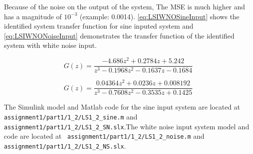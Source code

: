 Because of the noise on the output of the system, The MSE is much higher and has a magnitude of $10^{-3}$ (example: 0.0014). \autoref{eq:LSIWNOSineInput} shows the identified system transfer function for sine inputed system and \autoref{eq:LSIWNONoiseInput} demonstrates the transfer function of the identified system with white noise input.


\begin{equation}
	G(z) =	\frac{-4.686 z^2 + 0.2784 z + 5.242}{z^3 - 0.1968 z^2 - 0.1637 z - 0.1684}
	\label{eq:LSIWNOSineInput}
\end{equation}

\begin{equation}
	G(z) =	\frac{0.04364 z^2 + 0.0236 z + 0.008192}{z^3 - 0.7608 z^2 - 0.3535 z + 0.1425}
	\label{eq:LSIWNONoiseInput}
\end{equation}

The Simulink model and Matlab code for the sine input system are located at  \hspace{-1ex}\lstinline| assignment1/part1/1_2/LS1_2_sine.m| and  \hspace{-1ex}\lstinline| assignment1/part1/1_2/LS1_2_SN.slx|.The white noise input system model and code are located at  \hspace{-1ex}\lstinline| assignment1/part1/1_2/LS1_2_noise.m| and  \hspace{-1ex}\lstinline| assignment1/part1/1_2/LS1_2_NS.slx|.
